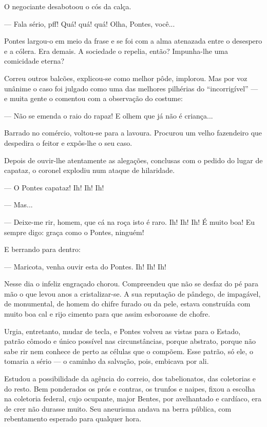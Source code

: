 O negociante desabotoou o cós da calça.

--- Fala sério, pff! Quá! quá! quá! Olha, Pontes, você...

Pontes largou-o em meio da frase e se foi com a alma atenazada entre o
desespero e a cólera. Era demais. A sociedade o repelia, então?
Impunha-lhe uma comicidade eterna?

Correu outros balcões, explicou-se como melhor pôde, implorou. Mas por
voz unânime o caso foi julgado como uma das melhores pilhérias do
``incorrigível'' --- e muita gente o comentou com a observação do
costume:

--- Não se emenda o raio do rapaz! E olhem que já não é criança...

Barrado no comércio, voltou-se para a lavoura. Procurou um velho
fazendeiro que despedira o feitor e expôs-lhe o seu caso.

Depois de ouvir-lhe atentamente as alegações, conclusas com o pedido do
lugar de capataz, o coronel explodiu num ataque de hilaridade.

--- O Pontes capataz! Ih! Ih! Ih!

--- Mas...

--- Deixe-me rir, homem, que cá na roça isto é raro. Ih! Ih! Ih! É muito
boa! Eu sempre digo: graça como o Pontes, ninguém!

E berrando para dentro:

--- Maricota, venha ouvir esta do Pontes. Ih! Ih! Ih!

Nesse dia o infeliz engraçado chorou. Compreendeu que não se desfaz do
pé para mão o que levou anos a cristalizar-se. A sua reputação de
pândego, de impagável, de monumental, de homem do chifre furado ou da
pele, estava construída com muito boa cal e rijo cimento para que assim
esboroasse de chofre.

Urgia, entretanto, mudar de tecla, e Pontes volveu as vistas para o
Estado, patrão cômodo e único possível nas circunstâncias, porque
abstrato, porque não sabe rir nem conhece de perto as células que o
compõem. Esse patrão, só ele, o tomaria a sério --- o caminho da
salvação, pois, embicava por ali.

Estudou a possibilidade da agência do correio, dos tabelionatos, das
coletorias e do resto. Bem ponderados os prós e contras, os trunfos e
naipes, fixou a escolha na coletoria federal, cujo ocupante, major
Bentes, por avelhantado e cardíaco, era de crer não durasse muito. Seu
aneurisma andava na berra pública, com rebentamento esperado para
qualquer hora.

